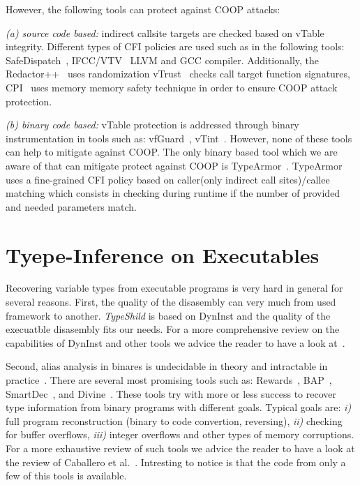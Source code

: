 However, the following tools can protect against COOP attacks:

\textit{(a) source code based:} indirect callsite targets are checked based on vTable integrity.
Different types of CFI policies are used such as in the following tools:
SafeDispatch~\cite{safedispatch:jang}, IFCC/VTV~\cite{vtv:tice} LLVM and GCC compiler.
Additionally, the Redactor++~\cite{crane:readactor++} uses randomization 
vTrust~\cite{zhang:vtrust} checks call target function signatures, 
CPI~\cite{volodymyr:cpi} uses memory memory safety technique
in order to ensure COOP attack protection.

\textit{(b) binary code based:} vTable protection is addressed through binary instrumentation in tools
such as: vfGuard~\cite{vfuard:aravind}, vTint~\cite{vtint:zhang}. However, none of these tools can
help to mitigate against COOP. The only binary based tool which we are aware of that
can mitigate protect against COOP is TypeArmor~\cite{veen:typearmor}.  
TypeArmor uses a fine-grained CFI policy based on caller(only indirect call sites)/callee matching 
which consists in checking during runtime if the number of provided and needed parameters match.

\section{Tyepe-Inference on Executables}
\label{Tyepe-Inference on Executables}
Recovering variable types from executable programs
is very hard in general for several reasons. 
First, the quality of the disasembly can very much from used
framework to another. \textit{TypeShild} is based on DynInst 
and the quality of the execuatble disasembly fits our needs. 
For a more comprehensive review on the capabilities of DynInst and other tools we
advice the reader to have a look at~\cite{andriesse:indepth}.

Second, alias analysis in binares is undecidable in theory and intractable in practice~\cite{alan:mycroft}.
There are several most promising tools such as: Rewards~\cite{lin:rewards}, BAP~\cite{bap:brumley}, 
SmartDec~\cite{fokin:smartdec}, and Divine~\cite{divine:balakrishnan}.
These tools try with more or less success to recover 
type information from binary programs with different goals.
Typical goals are: 
\textit{i)} full program reconstruction (binary to code convertion, reversing), 
\textit{ii)} checking for buffer overflows, 
\textit{iii)} integer overflows and other types of memory corruptions.
For a more exhaustive review of such tools we advice the reader to
have a look at the review of Caballero et al.~\cite{caballero:inference}.
Intresting to notice is that the code from only a few of this tools is available.


